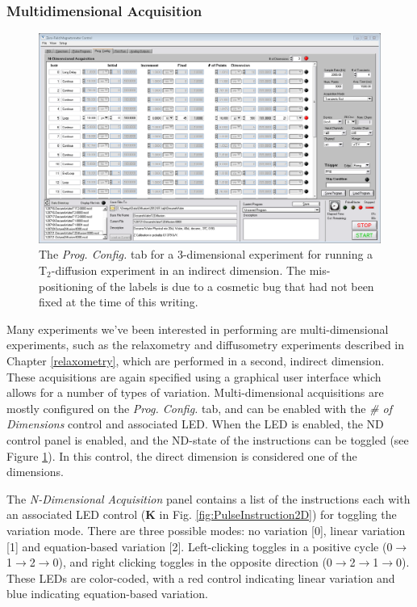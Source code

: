 \documentclass[PaulGanssle-Thesis.tex]{subfiles}
\begin{document}
\subsubsection{Multidimensional Acquisition}
\label{console.software.ndacq}
\begin{figure}[!h]
\includegraphics[width=\tw]{figures/console/program_config_2d.png}
\caption{The \textit{Prog. Config.} tab for a 3-dimensional experiment for running a T$_{2}$-diffusion experiment in an indirect dimension. The mis-positioning of the labels is due to a cosmetic bug that had not been fixed at the time of this writing.}
\label{fig:ProgConfigTab2D}
\end{figure}
Many experiments we've been interested in performing are multi-dimensional experiments, such as the relaxometry and diffusometry experiments described in Chapter \ref{relaxometry}, which are performed in a second, indirect dimension. These acquisitions are again specified using a graphical user interface which allows for a number of types of variation. Multi-dimensional acquisitions are mostly configured on the \textit{Prog. Config.} tab, and can be enabled with the \textit{\# of Dimensions} control and associated LED. When the LED is enabled, the ND control panel is enabled, and the ND-state of the instructions can be toggled (see Figure \ref{fig:ProgConfigTab2D}). In this control, the direct dimension is considered one of the dimensions.

The \textit{N-Dimensional Acquisition} panel contains a list of the instructions each with an associated LED control (\textbf{K} in Fig. \ref{fig:PulseInstruction2D}) for toggling the variation mode. There are three possible modes: no variation [0], linear variation [1] and equation-based variation [2]. Left-clicking toggles in a positive cycle (0$\rightarrow{}$1$\rightarrow{}$2$\rightarrow{}$0), and right clicking toggles in the opposite direction (0$\rightarrow{}$2$\rightarrow{}$1$\rightarrow{}$0). These LEDs are color-coded, with a red control indicating linear variation and blue indicating equation-based variation.
\end{document}
